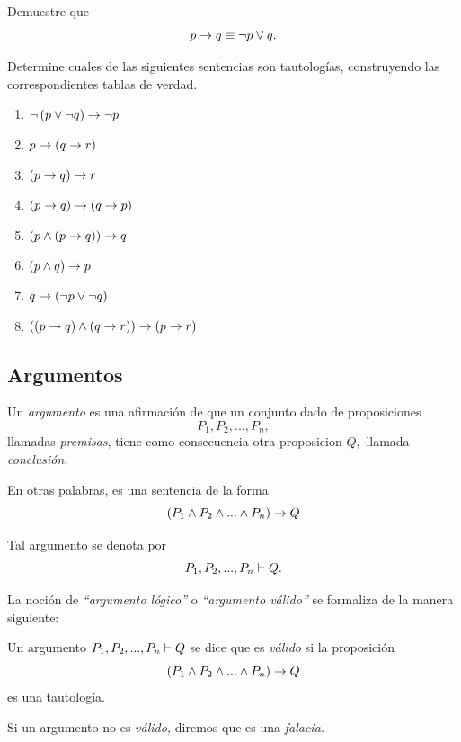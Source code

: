  \begin{problema}
  Demuestre que $$p\rightarrow q \equiv \neg p \vee q.$$
 \end{problema}




 \begin{problema} Determine cuales de las siguientes sentencias son tautolog\'ias, construyendo las correspondientes tablas de verdad.
  \begin{enumerate}
   \item $\neg\left( p \vee \neg q \right) \rightarrow \neg p$
   \item $p \rightarrow \left( q\rightarrow r \right)$
   \item $\left( p \rightarrow q \right)\rightarrow r$
   \item $\left( p\rightarrow q \right) \rightarrow \left( q\rightarrow p \right)$
   \item $\left( p \wedge \left( p \rightarrow q \right) \right) \rightarrow q$
   \item $\left( p \wedge q \right) \rightarrow p$
   \item $q \rightarrow \left( \neg p \vee \neg q \right)$
   \item $\left( \left( p\rightarrow q \right) \wedge \left( q \rightarrow r \right) \right) \rightarrow \left( p \rightarrow r \right)$
  \end{enumerate}

 \end{problema}



\subsection{Argumentos}


 Un \emph{argumento} es una afirmaci\'on de que un conjunto dado de proposiciones $$P_{1}, P_{2},...,P_{n},$$ llamadas \emph{premisas}, tiene como consecuencia otra proposicion $Q,$ llamada \emph{conclusi\'on.}
 
 En otras palabras, es una sentencia de la forma
 $$
  \left( P_{1} \wedge P_{2} \wedge...\wedge P_{n}\right) \rightarrow Q
  $$
 
 
 
 Tal argumento se denota por $$P_{1}, P_{2},...,P_{n} \vdash Q.$$



 La noci\'on de \emph{``argumento l\'ogico''} o \emph{``argumento v\'alido''} se formaliza de la manera siguiente:
 
 
 \begin{defn}
  \label{lip:4.4}
  Un argumento $P_{1}, P_{2},...,P_{n} \vdash Q$ se dice que es \emph{v\'alido} si la proposici\'on 
  $$
  \left( P_{1} \wedge P_{2} \wedge...\wedge P_{n}\right) \rightarrow Q
  $$ es una tautolog\'ia.
  
   Si un argumento no es \emph{v\'alido,} diremos que es una \emph{falacia.}
 \end{defn}




